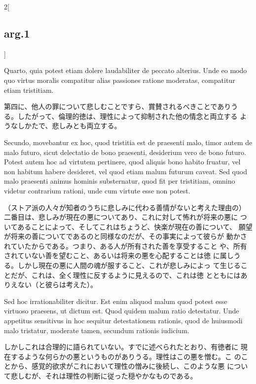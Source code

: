 \documentclass[paper=a4paper,fontsize=10pt,jafontsize=9pt,titlepage]{jlreq}
\begin{document}
\begin{paracol}{2}[\subsection{arg.1}]
\switchcolumn*

Quarto, quia potest etiam dolere laudabiliter de peccato
 alterius. Unde eo modo quo virtus moralis compatitur alias passiones
 ratione moderatas, compatitur etiam tristitiam.

\switchcolumn

第四に、他人の罪について悲しむことですら、賞賛されるべきことでありう
 る。したがって、倫理的徳は、理性によって抑制された他の情念と両立する
 ようなしかたで、悲しみとも両立する。

\switchcolumn*

Secundo, movebantur ex hoc, quod tristitia est de praesenti malo,
 timor autem de malo futuro, sicut delectatio de bono praesenti,
 desiderium vero de bono futuro. Potest autem hoc ad virtutem
 pertinere, quod aliquis bono habito fruatur, vel non habitum habere
 desideret, vel quod etiam malum futurum caveat. Sed quod malo
 praesenti animus hominis substernatur, quod fit per tristitiam,
 omnino videtur contrarium rationi, unde cum virtute esse non potest.

\switchcolumn

（ストア派の人々が知者のうちに悲しみに代わる善情がないと考えた理由の）
 二番目は、悲しみが現在の悪についてあり、これに対して怖れが将来の悪に
 ついてあることによって、そしてこれはちょうど、快楽が現在の善について、
 願望が将来の善についてであるのと同様なのだが、その事実によって彼らが
 動かされていたからである。つまり、ある人が所有された善を享受すること
 や、所有されていない善を望むこと、あるいは将来の悪を心配することは徳
 に属しうる。しかし現在の悪に人間の魂が服すること、これが悲しみによっ
 て生じることだが、これは、全く理性に反するように見えるので、これは徳
 とともにはありえない（と彼らは考えた）。

\switchcolumn*

Sed hoc irrationabiliter dicitur. Est enim aliquod malum quod potest
 esse virtuoso praesens, ut dictum est. Quod quidem malum ratio
 detestatur. Unde appetitus sensitivus in hoc sequitur detestationem
 rationis, quod de huiusmodi malo tristatur, moderate tamen, secundum
 rationis iudicium.

\switchcolumn

しかしこれは合理的に語られていない。すでに述べられたとおり、有徳者に
 現在するような何らかの悪というものがありうる。理性はこの悪を憎む。こ
 のことから、感覚的欲求がこれにおいて理性の憎みに後続し、このような悪
 について悲しむが、それは理性の判断に従った穏やかなものである。

\switchcolumn*


\end{paracol}
\end{document}
